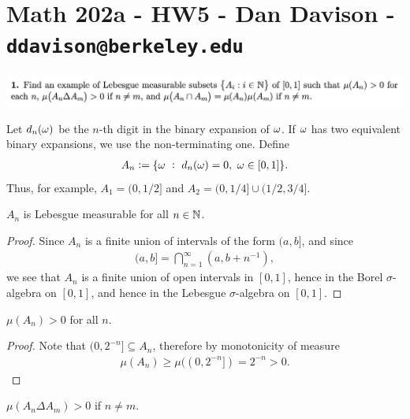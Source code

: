 \section*{Math 202a - HW5 - Dan Davison - \texttt{ddavison@berkeley.edu}}

\begin{mdframed}
\includegraphics[width=400pt]{img/analysis--berkeley-202a-hw05-781b.png}
\end{mdframed}


\begin{definition*}
  Let $d_n(\omega)$ be the $n$-th digit in the binary expansion of $\omega$. If $\omega$ has two equivalent binary
  expansions, we use the non-terminating one. Define
  \begin{align*}
    A_n := \{\omega ~:~ d_n(\omega) = 0, ~ \omega \in [0, 1]\}.
  \end{align*}
  Thus, for example, $A_1 = (0, 1/2]$ and $A_2 = (0, 1/4] \cup (1/2, 3/4]$.
\end{definition*}

\begin{claim*}
  $A_n$ is Lebesgue measurable for all $n \in \mathbb{N}$.
\end{claim*}

\begin{proof}
  Since $A_n$ is a finite union of intervals of the form $(a, b]$, and since
  \begin{align*}
    (a, b] = \bigcap_{n=1}^\infty (a, b + n^{-1}),
  \end{align*}
  we see that $A_n$ is a finite union of open intervals in $[0, 1]$, hence in the Borel $\sigma$-algebra
  on $[0, 1]$, and hence in the Lebesgue $\sigma$-algebra on $[0, 1]$.
\end{proof}

\begin{claim*}
  $\mu(A_n) > 0$ for all $n$.
\end{claim*}

\begin{proof}
  Note that $(0, 2^{-n}] \subseteq A_n$, therefore by monotonicity of measure
  \begin{align*}
    \mu(A_n) \geq \mu((0, 2^{-n}]) = 2^{-n} > 0.
  \end{align*}
\end{proof}

\begin{claim*}
  $\mu(A_n \Delta A_m) > 0$ if $n \neq m$.
\end{claim*}

